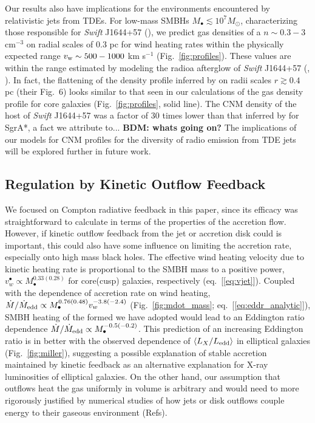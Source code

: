 \documentclass[usenatbib,fleqn]{mn2e}
\begin{document}
Our results also have implications for the environments encountered by
relativistic jets from TDEs.  For low-mass SMBHs $M_{\bullet} \lesssim
10^{7}M_{\odot}$, characterizing those responsible for {\it Swift}
J1644+57 (\citealt{Bloom:2011aa}), we predict gas densities of a $n
\sim 0.3-3$ cm$^{-3}$ on radial scales of 0.3 pc for wind heating
rates within the physically expected range $v_{\rm w} \sim 500-1000$
km s$^{-1}$ (Fig.~\ref{fig:profiles}).  These values are within the
range estimated by modeling the radioa afterglow of {\it Swift}
J1644+57 (\citealt{Metzger+12}, \citealt{Berger+12}).  In fact, the
flattening of the density profile inferred by \citet{Berger+12} on
radii scales $r \gtrsim 0.4$ pc (their Fig.~6) looks similar to that
seen in our calculations of the gas density profile for core galaxies
(Fig.~\ref{fig:profiles}, solid line).  The CNM density of the host of
{\it Swift} J1644+57 was a factor of 30 times lower than that inferred
by \citet{Quataert:2004a} for SgrA*, a fact we attribute to...{\bf
  BDM: whats going on?}  The implications of our models for CNM
profiles for the diversity of radio emission from TDE jets will be
explored further in future work.

\subsection{Regulation by Kinetic Outflow Feedback}
\label{sec:kinetic}

We focused on Compton radiative feedback in this paper, since its
efficacy was straightforward to calculate in terms of the properties
of the accretion flow.  However, if kinetic outflow feedback from the
jet or accretion disk could is important, this could also have some
influence on limiting the accretion rate, especially onto high mass
black holes.  The effective wind heating velocity due to kinetic
heating rate is proportional to the SMBH mass to a positive power,
$v_{w}^{\bullet} \propto M_{\bullet}^{0.33(0.28)}$ for core(cusp)
galaxies, respectively (eq.~[\ref{eq:vjet}]).  Coupled with the
dependence of accretion rate on wind heating, $\dot{M}/\dot{M}_{\rm
  edd} \propto M_{\bullet}^{0.76(0.48)}v_{w}^{-3.8(-2.4)}$
(Fig.~\ref{fig:mdot_mass}; eq.~[\ref{eq:eddr_analytic}]), SMBH heating
of the formed we have adopted would lead to an Eddington ratio
dependence $\dot{M}/\dot{M}_{\rm edd} \propto
M_{\bullet}^{-0.5(-0.2)}$.  This prediction of an increasing Eddington
ratio is in better with the observed dependence of $\langle
L_{X}/L_{\rm edd} \rangle$ in elliptical galaxies
(Fig.~\ref{fig:miller}), suggesting a possible explanation of stable
accretion maintained by kinetic feedback as an alternative explanation
for X-ray luminosities of elliptical galaxies.  On the other hand, our
assumption that outflows heat the gas uniformly in volume is arbitrary
and would need to more rigorously justified by numerical studies of
how jets or disk outflows couple energy to their gaseous environment
(Refs).
\end{document}
